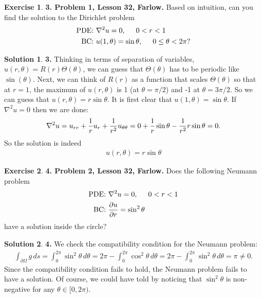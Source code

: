 \documentclass{book}
\theoremstyle{definition}
\newtheorem*{exer*}{Exercise}
\newtheorem*{sln*}{Solution}
\newcommand{\p}{\partial}
\newcommand{\f}[2]{\frac{#1}{#2}}
\begin{document}
\begin{exer*}\textbf{3. Problem 1, Lesson 32, Farlow.} Based on intuition, can you find the solution to the Dirichlet problem 
	\begin{align*}
	\text{PDE: } &\laplacian u = 0, \hspace{0.5cm} 0 < r < 1\\
	\text{BC: }  &u(1,\theta) = \sin\theta, \hspace{0.5cm} 0 \leq \theta < 2\pi? 
	\end{align*}
	
	\begin{sln*}\textbf{3. }
		Thinking in terms of separation of variables, $u(r,\theta) = R(r)\Theta(\theta)$, we can guess that $\Theta(\theta)$ has to be periodic like $\sin(\theta)$. Next, we can think of $R(r)$ as a function that scales $\Theta(\theta)$ so that at $r = 1$, the maximum of $u(r,\theta)$ is 1 (at $\theta = \pi/2$) and -1 at $\theta = 3\pi/2$. So we can guess that $u(r,\theta) = r\sin\theta$. It is first clear that $u(1,\theta) = \sin\theta$. If $\nabla^2 u = 0 $ then we are done:
		\begin{align*}
		\laplacian u = u_{rr} + \f{1}{r}u_r + \f{1}{r^2}u_{\theta\theta}= 0 + \f{1}{r}\sin\theta - \f{1}{r^2}r\sin\theta = 0.
		\end{align*}
		So the solution is indeed
		\begin{align*}
		\boxed{u(r,\theta) = r\sin\theta}
		\end{align*}
	\end{sln*}
\end{exer*}




\newpage

\begin{exer*}\textbf{4. Problem 2, Lesson 32, Farlow.} Does the following Neumann problem
	\begin{align*}
	\text{PDE: } &\laplacian u = 0, \hspace{0.5cm} 0 < r < 1\\
	\text{BC: } &\f{\p u}{\p r} = \sin^2\theta
	\end{align*}
have a solution inside the circle?
	
	\begin{sln*}\textbf{4. }
		We check the compatibility condition for the Neumann problem:
		\begin{align*}
		\int_{\p \Omega} g\,ds = \int^{2\pi}_0 \sin^2\theta \, d\theta = 2\pi - \int^{2\pi}_0\cos^2\theta\,d\theta = 2\pi - \int^{2\pi}_0 \sin^2\theta\,d\theta = \pi \neq 0.
		\end{align*}
		Since the compatibility condition fails to hold, the Neumann problem fails to have a solution. Of course, we could have told by noticing that $\sin^2\theta$ is non-negative for any $\theta \in [0,2\pi)$. 
	\end{sln*}
\end{exer*}
\end{document}
